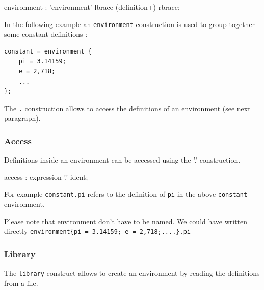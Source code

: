 
\begin{rail}
environment : 'environment' lbrace (definition+) rbrace; 
\end{rail}

In the following example an \lstinline'environment' construction is used to group together some constant definitions :

\begin{lstlisting}
constant = environment {
	pi = 3.14159;
	e = 2,718;
	...
};
\end{lstlisting}
The  \lstinline'.' construction allows to access the definitions of an environment (see next paragraph).

\subsubsection{Access} 
Definitions inside an environment can be accessed using 
the '.' construction. 


\begin{rail}
access :    expression '.' ident;       
\end{rail}

For example \lstinline'constant.pi' refers to the definition of \lstinline'pi' in the above \lstinline'constant' environment.

Please note that environment don't have to be named. We could have written directly 
\lstinline'environment{pi = 3.14159; e = 2,718;....}.pi'

\subsubsection{Library} 
The \lstinline'library' construct allows to create an environment by reading the definitions from a file.

